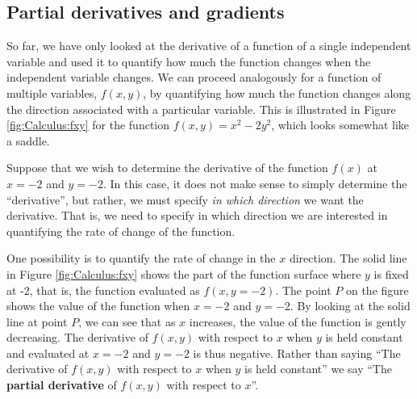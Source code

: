 \subsection{Partial derivatives and gradients}
\label{sec:Calculus:gradients}
So far, we have only looked at the derivative of a function of a single independent variable and used it to quantify how much the function changes when the independent variable changes. We can proceed analogously for a function of multiple variables, $f(x,y)$, by quantifying how much the function changes along the direction associated with a particular variable. This is illustrated in Figure \ref{fig:Calculus:fxy} for the function $f(x,y)=x^2-2y^2$, which looks somewhat like a saddle. 


Suppose that we wish to determine the derivative of the function $f(x)$ at $x=-2$ and $y=-2$. In this case, it does not make sense to simply determine the ``derivative'', but rather, we must specify \textit{in which direction} we want the derivative. That is, we need to specify in which direction we are interested in quantifying the rate of change of the function.

One possibility is to quantify the rate of change in the $x$ direction. The solid line in Figure \ref{fig:Calculus:fxy} shows the part of the function surface where $y$ is fixed at -2, that is, the function evaluated as $f(x,y=-2)$. The point $P$ on the figure shows the value of the function when $x=-2$ and $y=-2$. By looking at the solid line at point $P$, we can see that as $x$ increases, the value of the function is gently decreasing. The derivative of $f(x,y)$ with respect to $x$ when $y$ is held constant and evaluated at $x=-2$ and $y=-2$ is thus negative. Rather than saying ``The derivative of $f(x,y)$ with respect to $x$ when $y$ is held constant'' we say ``The \textbf{partial derivative} of $f(x,y)$ with respect to $x$''.

